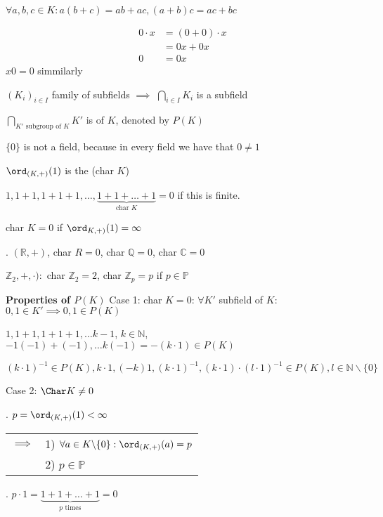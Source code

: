 $\forall a,b,c \in K: a(b+c) = ab+ac, (a+b)c = ac+bc$

\begin{align*}
  0\cdot x &= (0+0) \cdot x \\
           &= 0x + 0x \\
         0 &= 0x
\end{align*}
$x0 = 0$ simmilarly

$(K_i)_{i\in I}$ family of subfields $\implies$ $\bigcap_{i\in I} K_i$ is a subfield

\begin{definition}
  $\bigcap_{K' \text{ subgroup of $K$}} K'$ is  of $K$, denoted by $P(K)$
\end{definition}

$\{0\}$ is not a field, because in every field we have that $0 \neq 1$

\begin{definition}
  $\ord_{(K,+)} (1)$ is the  (char $K$)
\end{definition}

$1,1+1, 1+1+1, \ldots, \underbrace{1+1+ \ldots +1}_{\text{char $K$}} = 0$ if this is finite.

char $K = 0$ if $\ord_{K,+)} (1) = \infty$

\Example.
$(\mathbb{R}, +)$, char $R = 0$, char $\mathbb{Q} = 0$, char $\mathbb{C} = 0$

$\mathbb{Z}_2, +, \cdot): $ char $\mathbb{Z}_2 = 2$, char $\mathbb{Z}_p = p$ if $p \in \mathbb{P}$

\textbf{Properties of $P(K)$}
Case 1: 
char $K=0$: 
$\forall K'$ subfield of $K$: $0,1 \in K' \implies 0,1 \in P(K)$

$1,1+1, 1+1+1, \ldots k-1$, $k \in \mathbb{N}$, $-1(-1)+(-1), \ldots k(-1) = -(k\cdot 1) \in P(K)$

$(k\cdot 1)^{-1} \in P(K), k\cdot 1, (-k)1,(k\cdot 1)^{-1}, (k\cdot 1)\cdot (l\cdot 1)^{-1} \in P(K), l \in \mathbb{N} \backslash \{0\}$


Case 2: $\Char K \neq 0$

\Lemma.
$p = \ord_{(K,+)} (1) < \infty$
\begin{tabular}{ll}
$\implies$
  & 1) $\forall a \in K \backslash \{0\}: \ord_{(K,+)} (a) = p$\\
  & 2) $p \in \mathbb{P}$
\end{tabular}

\Proof.
$p\cdot 1 = \underbrace{1+1+ \ldots +1}_{p \text{ times}} = 0$

